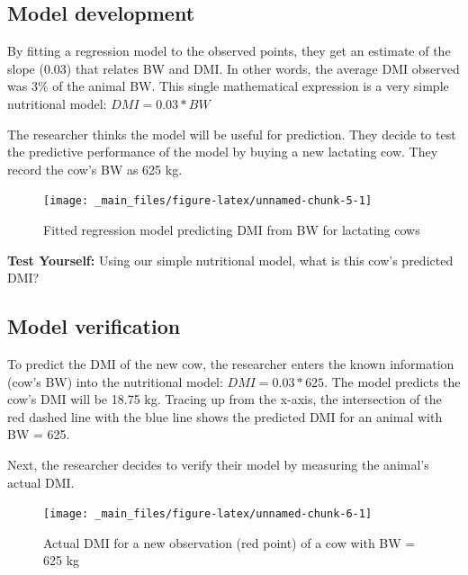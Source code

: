 \documentclass[
]{book}
\begin{document}
\hypertarget{model-development}{%
\subsection{Model development}\label{model-development}}

By fitting a regression model to the observed points, they get an estimate of the slope (0.03) that relates BW and DMI. In other words, the average DMI observed was 3\% of the animal BW. This single mathematical expression is a very simple nutritional model: \(DMI = 0.03 * BW\)

The researcher thinks the model will be useful for prediction. They decide to test the predictive performance of the model by buying a new lactating cow. They record the cow's BW as 625 kg.

\begin{figure}

{\centering \texttt{[image: \_main\_files/figure-latex/unnamed-chunk-5-1]} 

}

\caption{Fitted regression model predicting DMI from BW for lactating cows}\label{fig:unnamed-chunk-5}
\end{figure}

\textbf{Test Yourself: }
Using our simple nutritional model, what is this cow's predicted DMI?

\hypertarget{model-verification}{%
\subsection{Model verification}\label{model-verification}}

To predict the DMI of the new cow, the researcher enters the known information (cow's BW) into the nutritional model: \(DMI = 0.03 * 625\). The model predicts the cow's DMI will be 18.75 kg. Tracing up from the x-axis, the intersection of the red dashed line with the blue line shows the predicted DMI for an animal with BW = 625.

Next, the researcher decides to verify their model by measuring the animal's actual DMI.

\begin{figure}

{\centering \texttt{[image: \_main\_files/figure-latex/unnamed-chunk-6-1]} 

}

\caption{Actual DMI for a new observation (red point) of a cow with BW = 625 kg}\label{fig:unnamed-chunk-6}
\end{figure}
\end{document}
